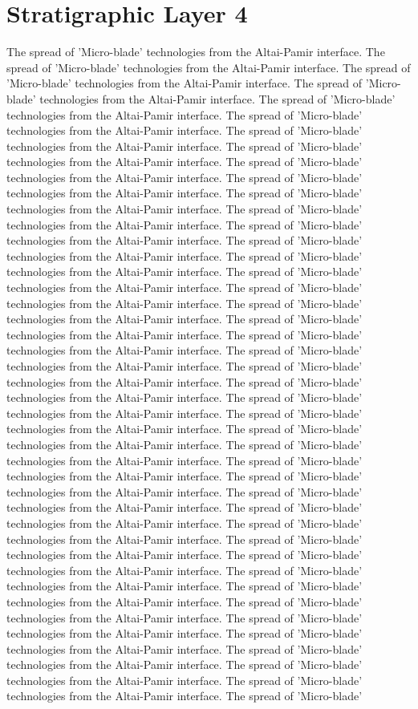 \section{Stratigraphic Layer 4}
The spread of 'Micro-blade' technologies from the Altai-Pamir interface. The spread of 'Micro-blade' technologies from the Altai-Pamir interface. The spread of 'Micro-blade' technologies from the Altai-Pamir interface. The spread of 'Micro-blade' technologies from the Altai-Pamir interface. The spread of 'Micro-blade' technologies from the Altai-Pamir interface. The spread of 'Micro-blade' technologies from the Altai-Pamir interface. The spread of 'Micro-blade' technologies from the Altai-Pamir interface. The spread of 'Micro-blade' technologies from the Altai-Pamir interface. The spread of 'Micro-blade' technologies from the Altai-Pamir interface. The spread of 'Micro-blade' technologies from the Altai-Pamir interface. The spread of 'Micro-blade' technologies from the Altai-Pamir interface. The spread of 'Micro-blade' technologies from the Altai-Pamir interface. The spread of 'Micro-blade' technologies from the Altai-Pamir interface. The spread of 'Micro-blade' technologies from the Altai-Pamir interface. The spread of 'Micro-blade' technologies from the Altai-Pamir interface. The spread of 'Micro-blade' technologies from the Altai-Pamir interface. The spread of 'Micro-blade' technologies from the Altai-Pamir interface. The spread of 'Micro-blade' technologies from the Altai-Pamir interface. The spread of 'Micro-blade' technologies from the Altai-Pamir interface. The spread of 'Micro-blade' technologies from the Altai-Pamir interface. The spread of 'Micro-blade' technologies from the Altai-Pamir interface. The spread of 'Micro-blade' technologies from the Altai-Pamir interface. The spread of 'Micro-blade' technologies from the Altai-Pamir interface. The spread of 'Micro-blade' technologies from the Altai-Pamir interface. The spread of 'Micro-blade' technologies from the Altai-Pamir interface. The spread of 'Micro-blade' technologies from the Altai-Pamir interface. The spread of 'Micro-blade' technologies from the Altai-Pamir interface. The spread of 'Micro-blade' technologies from the Altai-Pamir interface. The spread of 'Micro-blade' technologies from the Altai-Pamir interface. The spread of 'Micro-blade' technologies from the Altai-Pamir interface. The spread of 'Micro-blade' technologies from the Altai-Pamir interface. The spread of 'Micro-blade' technologies from the Altai-Pamir interface. The spread of 'Micro-blade' technologies from the Altai-Pamir interface. The spread of 'Micro-blade' technologies from the Altai-Pamir interface. The spread of 'Micro-blade' technologies from the Altai-Pamir interface. The spread of 'Micro-blade' technologies from the Altai-Pamir interface. The spread of 'Micro-blade' technologies from the Altai-Pamir interface. The spread of 'Micro-blade' technologies from the Altai-Pamir interface. The spread of 'Micro-blade' technologies from the Altai-Pamir interface. The spread of 'Micro-blade' technologies from the Altai-Pamir interface. The spread of 'Micro-blade' technologies from the Altai-Pamir interface. The spread of 'Micro-blade' technologies from the Altai-Pamir interface. The spread of 'Micro-blade' 
